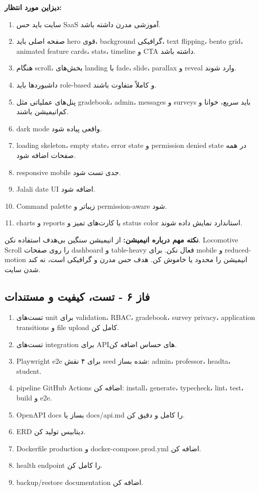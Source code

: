 \documentclass[12pt,a4paper]{article}
\begin{document}
\begin{tcolorbox}[title=پرامپت نهایی برای Claude - از اینجا کپی کن]
\textbf{دیزاین مورد انتظار:}
\begin{enumerate}
  \item سایت باید حس SaaS آموزشی مدرن داشته باشد.
  \item صفحه اصلی باید hero قوی، background گرافیکی، text flipping، bento grid، animated feature cards، stats، timeline و CTA داشته باشد.
  \item هنگام scroll، بخش‌های landing با fade، slide، parallax و reveal وارد شوند.
  \item داشبوردها باید role-based و کاملاً متفاوت باشند.
  \item پنل‌های عملیاتی مثل gradebook، admin، messages و surveys باید سریع، خوانا و کم‌انیمیشن باشند.
  \item dark mode واقعی پیاده شود.
  \item loading skeleton، empty state، error state و permission denied state در همه صفحات اضافه شود.
  \item responsive mobile جدی تست شود.
  \item Jalali date UI اضافه شود.
  \item Command palette زیباتر و permission-aware شود.
  \item charts و reports با کارت‌های تمیز و status color استاندارد نمایش داده شوند.
\end{enumerate}

\textbf{نکته مهم درباره انیمیشن:} از انیمیشن سنگین بی‌هدف استفاده نکن. Locomotive Scroll را روی صفحات dashboard و table-heavy فعال نکن. برای mobile و reduced-motion انیمیشن را محدود یا خاموش کن. هدف حس مدرن و گرافیکی است، نه کند شدن سایت.

\subsection*{فاز ۶ - تست، کیفیت و مستندات}
\begin{enumerate}
  \item تست‌های unit برای validation، RBAC، gradebook، survey privacy، application transitions و file upload کامل کن.
  \item تست‌های integration برای APIهای حساس اضافه کن.
  \item Playwright e2e برای ۴ نقش seed شده بساز: admin، professor، headta، student.
  \item pipeline GitHub Actions اضافه کن: install، generate، typecheck، lint، test، build و e2e.
  \item OpenAPI docs بساز یا docs/api.md را کامل و دقیق کن.
  \item ERD دیتابیس تولید کن.
  \item Dockerfile production و docker-compose.prod.yml اضافه کن.
  \item health endpoint را کامل کن.
  \item backup/restore documentation اضافه کن.
\end{enumerate}


\end{tcolorbox}
\end{document}
